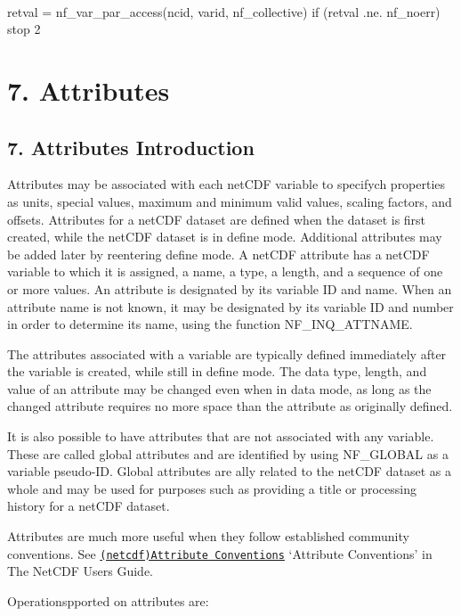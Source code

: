  

\begin{DoxyVerb}  retval = nf_var_par_access(ncid, varid, nf_collective)
  if (retval .ne. nf_noerr) stop 2
\end{DoxyVerb}


\section*{7. Attributes }

\subsection*{7. Attributes Introduction }

Attributes may be associated with each net\+C\+DF variable to specifych properties as units, special values, maximum and minimum valid values, scaling factors, and offsets. Attributes for a net\+C\+DF dataset are defined when the dataset is first created, while the net\+C\+DF dataset is in define mode. Additional attributes may be added later by reentering define mode. A net\+C\+DF attribute has a net\+C\+DF variable to which it is assigned, a name, a type, a length, and a sequence of one or more values. An attribute is designated by its variable ID and name. When an attribute name is not known, it may be designated by its variable ID and number in order to determine its name, using the function N\+F\+\_\+\+I\+N\+Q\+\_\+\+A\+T\+T\+N\+A\+ME.

The attributes associated with a variable are typically defined immediately after the variable is created, while still in define mode. The data type, length, and value of an attribute may be changed even when in data mode, as long as the changed attribute requires no more space than the attribute as originally defined.

It is also possible to have attributes that are not associated with any variable. These are called global attributes and are identified by using N\+F\+\_\+\+G\+L\+O\+B\+AL as a variable pseudo-\/\+ID. Global attributes are ally related to the net\+C\+DF dataset as a whole and may be used for purposes such as providing a title or processing history for a net\+C\+DF dataset.

Attributes are much more useful when they follow established community conventions. See \href{netcdf.html#Attribute-Conventions}{\tt (netcdf)Attribute Conventions} ‘\+Attribute Conventions’ in The Net\+C\+DF Users Guide.

Operationspported on attributes are\+:


